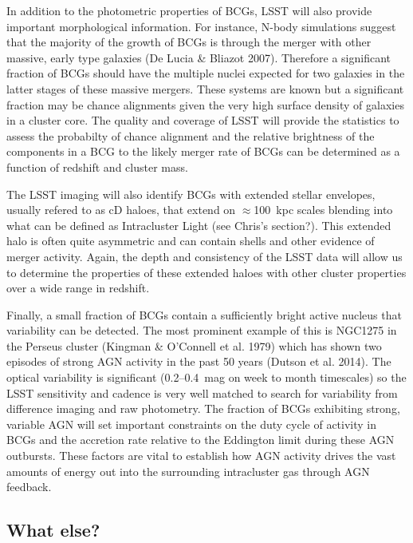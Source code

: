 \documentclass[a4paper,11pt]{article}
\begin{document}
In addition to the photometric properties
of BCGs, LSST will also provide important
morphological information. For instance,
N-body simulations suggest that the majority
of the growth of BCGs is through the merger
with other massive, early type galaxies 
(De Lucia \& Bliazot 2007). Therefore a
significant fraction of BCGs should have 
the multiple nuclei expected for two 
galaxies in the latter stages of these
massive mergers. These systems are known
but a significant fraction may be chance
alignments given the very high surface density of galaxies
in a cluster core. The quality and coverage of
LSST will provide the statistics to assess
the probabilty of chance alignment and the
relative brightness of the components
in a BCG to the likely merger rate of BCGs
can be determined as a function of redshift
and cluster mass.

The LSST imaging will also identify BCGs
with extended stellar envelopes,
usually refered to as cD haloes,
that extend on $\approx$100~kpc scales
blending into what can be defined
as Intracluster Light (see Chris's section?).
This extended halo is often quite asymmetric
and can contain shells and other evidence
of merger activity. Again, the depth and
consistency of the LSST data will allow us
to determine the properties of these 
extended haloes with other cluster properties
over a wide range in redshift.

Finally, a small fraction of BCGs contain a
sufficiently bright active nucleus that
variability can be detected. The most prominent
example of this is NGC1275 in the Perseus cluster
(Kingman \& O'Connell et al. 1979) which has shown 
two episodes of strong AGN activity in the past
50 years (Dutson et al. 2014). The optical
variability is significant (0.2--0.4~mag on
week to month timescales) so the LSST sensitivity
and cadence is very well matched to search for 
variability from difference imaging and raw
photometry. The fraction of BCGs exhibiting 
strong, variable AGN will set important
constraints on the duty cycle of activity in 
BCGs and the accretion rate relative to 
the Eddington limit during these AGN outbursts.
These factors are vital to establish how
AGN activity drives the vast amounts of energy
out into the surrounding intracluster gas
through AGN feedback.



\subsection{What else?}
\end{document}
